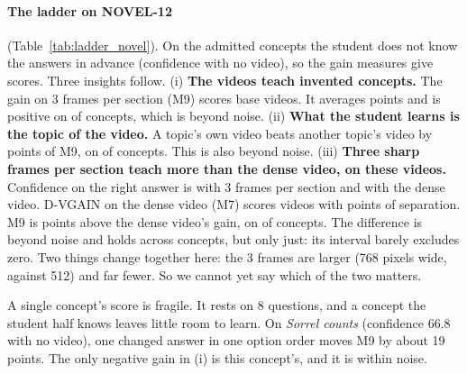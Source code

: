 \paragraph{The ladder on NOVEL-12} (Table~\ref{tab:ladder_novel}). On the \LadNovelTopics{} admitted concepts the
student does not know the answers in advance (confidence \LadNovelSBlind{} with no video), so the gain measures give
scores. Three insights follow.
(i) \textbf{The videos teach invented concepts.} The gain on 3 frames per section (M9) scores
\LadNovelDefinedNine{} base videos. It averages \NMGain{} points and is positive on \NMGainPos{} of \NMGainN{}
concepts, which is beyond noise.
(ii) \textbf{What the student learns is the topic of the video.} A topic's own video beats another topic's video by
\LadNovelSepNine{} points of M9, on \NMSpecPos{} of \NMSpecN{} concepts. This is also beyond noise.
(iii) \textbf{Three sharp frames per section teach more than the dense video, on these videos.} Confidence on the
right answer is \LadNovelSFrames{} with 3 frames per section and \LadNovelSVisual{} with the dense video. D-VGAIN on
the dense video (M7) scores \LadNovelDefinedSeven{} videos with \LadNovelSepSeven{} points of separation. M9 is
\NMFramesDense{} points above the dense video's gain, on \NMFramesDensePos{} of \NMFramesDenseN{} concepts. The
difference is beyond noise and holds across concepts, but only just: its interval barely excludes zero. Two things
change together here: the 3 frames are larger (768 pixels wide, against 512) and far fewer. So we cannot yet say
which of the two matters.

A single concept's score is fragile. It rests on 8 questions, and a concept the student half knows leaves little room
to learn. On \emph{Sorrel counts} (confidence 66.8 with no video), one changed answer in one option order moves M9 by
about 19 points. The only negative gain in (i) is this concept's, and it is within noise.

